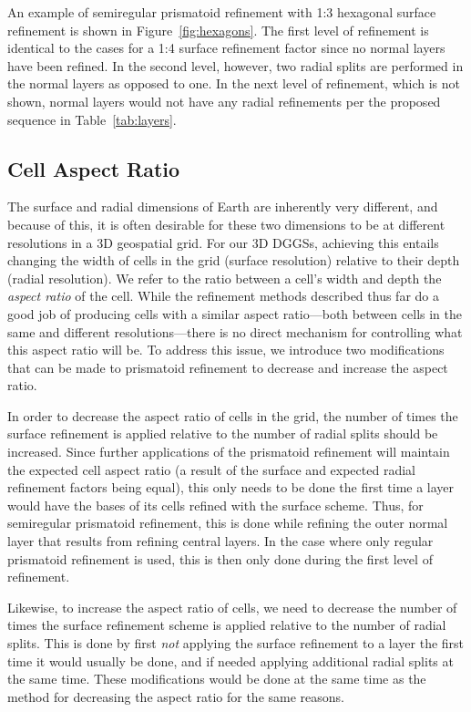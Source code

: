 An example of semiregular prismatoid refinement with 1:3 hexagonal surface refinement is shown in Figure~\ref{fig:hexagons}.
The first level of refinement is identical to the cases for a 1:4 surface refinement factor since no normal layers have been refined.
In the second level, however, two radial splits are performed in the normal layers as opposed to one.
In the next level of refinement, which is not shown, normal layers would not have any radial refinements per the proposed sequence in Table~\ref{tab:layers}.


\subsection{Cell Aspect Ratio} \label{sec:grid:ar}
The surface and radial dimensions of Earth are inherently very different, and because of this, it is often desirable for these two dimensions to be at different resolutions in a 3D geospatial grid.
For our 3D DGGSs, achieving this entails changing the width of cells in the grid (surface resolution) relative to their depth (radial resolution).
We refer to the ratio between a cell's width and depth the \textit{aspect ratio} of the cell.
While the refinement methods described thus far do a good job of producing cells with a similar aspect ratio---both between cells in the same and different resolutions---there is no direct mechanism for controlling what this aspect ratio will be.
To address this issue, we introduce two modifications that can be made to prismatoid refinement to decrease and increase the aspect ratio.


In order to decrease the aspect ratio of cells in the grid, the number of times the surface refinement is applied relative to the number of radial splits should be increased.
Since further applications of the prismatoid refinement will maintain the expected cell aspect ratio (a result of the surface and expected radial refinement factors being equal), this only needs to be done the first time a layer would have the bases of its cells refined with the surface scheme.
Thus, for semiregular prismatoid refinement, this is done while refining the outer normal layer that results from refining central layers.
In the case where only regular prismatoid refinement is used, this is then only done during the first level of refinement.


Likewise, to increase the aspect ratio of cells, we need to decrease the number of times the surface refinement scheme is applied relative to the number of radial splits.
This is done by first \textit{not} applying the surface refinement to a layer the first time it would usually be done, and if needed applying additional radial splits at the same time.
These modifications would be done at the same time as the method for decreasing the aspect ratio for the same reasons.


